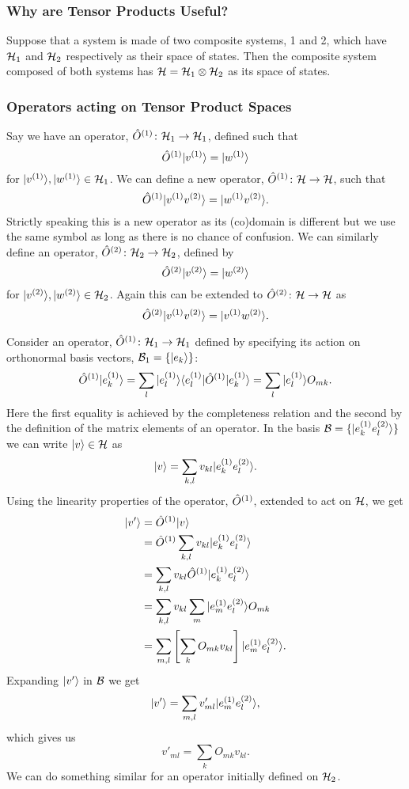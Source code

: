     \subsubsection{Why are Tensor Products Useful?}
    Suppose that a system is made of two composite systems, 1 and 2, which have \(\mathcal{H}_1\) and \(\mathcal{H}_2\) respectively as their space of states.
    Then the composite system composed of both systems has \(\mathcal{H} = \mathcal{H}_1\otimes\mathcal{H}_2\) as its space of states.
    
    \subsubsection{Operators acting on Tensor Product Spaces}
    Say we have an operator, \(\hat{O}^{(1)}\colon\mathcal{H}_1\to\mathcal{H}_1\), defined such that
    \[\hat{O}^{(1)}\vert {v^{(1)}} \rangle = \vert {w^{(1)}} \rangle\]
    for \(\vert {v^{(1)}} \rangle, \vert {w^{(1)}} \rangle\in\mathcal{H}_1\).
    We can define a new operator, \(\hat{O}^{(1)}\colon\mathcal{H}\to\mathcal{H}\), such that
    \[\hat{O}^{(1)}\vert {v^{(1)}v^{(2)}} \rangle = \vert {w^{(1)}v^{(2)}} \rangle.\]
    Strictly speaking this is a new operator as its (co)domain is different but we use the same symbol as long as there is no chance of confusion.
    We can similarly define an operator, \(\hat{O}^{(2)}\colon\mathcal{H}_2\to\mathcal{H}_2\), defined by
    \[\hat{O}^{(2)}\vert {v^{(2)}} \rangle = \vert {w^{(2)}} \rangle\]
    for \(\vert {v^{(2)}} \rangle, \vert {w^{(2)}} \rangle \in\mathcal{H}_2\).
    Again this can be extended to \(\hat{O}^{(2)}\colon\mathcal{H}\to\mathcal{H}\) as
    \[\hat{O}^{(2)}\vert {v^{(1)}v^{(2)}} \rangle = \vert {v^{(1)}w^{(2)}} \rangle.\]
    
    Consider an operator, \(\hat{O}^{(1)}\colon\mathcal{H}_1\to\mathcal{H}_1\) defined by specifying its action on orthonormal basis vectors, \(\mathcal{B}_1 = \{\vert {e_k} \rangle\}\):
    \[\hat{O}^{(1)}\vert {e_k^{(1)}} \rangle = \sum_l\vert {e_l^{(1)}}\rangle\langle {e_l^{(1)}} \vert\hat{O}^{(1)}\vert {e_k^{(1)}} \rangle = \sum_l \vert {e_l^{(1)}} \rangle O_{mk}.\]
    Here the first equality is achieved by the completeness relation and the second by the definition of the matrix elements of an operator.
    In the basis \(\mathcal{B} = \{\vert {e_k^{(1)}e_l^{(2)}} \rangle\}\) we can write \(\vert {v} \rangle\in\mathcal{H}\) as
    \[\vert {v} \rangle = \sum_{k, l}v_{kl}\vert {e_k^{(1)}e_l^{(2)}} \rangle.\]
    Using the linearity properties of the operator, \(\hat{O}^{(1)}\), extended to act on \(\mathcal{H}\), we get
    \begin{align*}
        \vert {v'} \rangle &= \hat{O}^{(1)}\vert {v} \rangle\\
        &= \hat{O}^{(1)}\sum_{k, l}v_{kl}\vert {e_k^{(1)}e_l^{(2)}} \rangle\\
        &= \sum_{k, l} v_{kl}\hat{O}^{(1)}\vert {e_k^{(1)}e_l^{(2)}} \rangle\\
        &= \sum_{k, l} v_{kl}\sum_m\vert {e_m^{(1)}e_l^{(2)}} \rangle O_{mk}\\
        &= \sum_{m, l}\left[\sum_k O_{mk}v_{kl}\right]\vert {e_m^{(1)}e_l^{(2)}} \rangle.
    \end{align*}
    Expanding \(\vert {v'} \rangle\) in \(\mathcal{B}\) we get
    \[\vert {v'} \rangle = \sum_{m, l}v'_{ml}\vert {e_m^{(1)}e_l^{(2)}} \rangle,\]
    which gives us
    \[v'_{ml} = \sum_k O_{mk}v_{kl}.\]
    We can do something similar for an operator initially defined on \(\mathcal{H}_2\).
    
